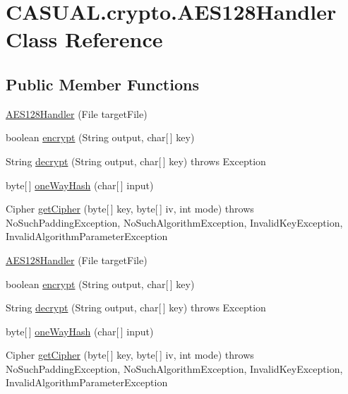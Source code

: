 \hypertarget{class_c_a_s_u_a_l_1_1crypto_1_1_a_e_s128_handler}{\section{C\-A\-S\-U\-A\-L.\-crypto.\-A\-E\-S128\-Handler Class Reference}
\label{class_c_a_s_u_a_l_1_1crypto_1_1_a_e_s128_handler}
}
\subsection*{Public Member Functions}
\begin{DoxyCompactItemize}
\item 
\hyperlink{class_c_a_s_u_a_l_1_1crypto_1_1_a_e_s128_handler_a4233be364193baf998724234ca4c7ab1}{A\-E\-S128\-Handler} (File target\-File)
\item 
boolean \hyperlink{class_c_a_s_u_a_l_1_1crypto_1_1_a_e_s128_handler_ae444a266163b8c7983391cfeca91fd9f}{encrypt} (String output, char\mbox{[}$\,$\mbox{]} key)
\item 
String \hyperlink{class_c_a_s_u_a_l_1_1crypto_1_1_a_e_s128_handler_a27231903f5c8ee3bea634e915c0e1499}{decrypt} (String output, char\mbox{[}$\,$\mbox{]} key)  throws Exception 
\item 
byte\mbox{[}$\,$\mbox{]} \hyperlink{class_c_a_s_u_a_l_1_1crypto_1_1_a_e_s128_handler_af8b956ca34bcdbb8a22551fe66ae2c65}{one\-Way\-Hash} (char\mbox{[}$\,$\mbox{]} input)
\item 
Cipher \hyperlink{class_c_a_s_u_a_l_1_1crypto_1_1_a_e_s128_handler_aa057ae7e639b9622dbed9b17443aa263}{get\-Cipher} (byte\mbox{[}$\,$\mbox{]} key, byte\mbox{[}$\,$\mbox{]} iv, int mode)  throws No\-Such\-Padding\-Exception, No\-Such\-Algorithm\-Exception, Invalid\-Key\-Exception, Invalid\-Algorithm\-Parameter\-Exception 
\item 
\hyperlink{class_c_a_s_u_a_l_1_1crypto_1_1_a_e_s128_handler_a4233be364193baf998724234ca4c7ab1}{A\-E\-S128\-Handler} (File target\-File)
\item 
boolean \hyperlink{class_c_a_s_u_a_l_1_1crypto_1_1_a_e_s128_handler_ae444a266163b8c7983391cfeca91fd9f}{encrypt} (String output, char\mbox{[}$\,$\mbox{]} key)
\item 
String \hyperlink{class_c_a_s_u_a_l_1_1crypto_1_1_a_e_s128_handler_a27231903f5c8ee3bea634e915c0e1499}{decrypt} (String output, char\mbox{[}$\,$\mbox{]} key)  throws Exception 
\item 
byte\mbox{[}$\,$\mbox{]} \hyperlink{class_c_a_s_u_a_l_1_1crypto_1_1_a_e_s128_handler_af8b956ca34bcdbb8a22551fe66ae2c65}{one\-Way\-Hash} (char\mbox{[}$\,$\mbox{]} input)
\item 
Cipher \hyperlink{class_c_a_s_u_a_l_1_1crypto_1_1_a_e_s128_handler_aa057ae7e639b9622dbed9b17443aa263}{get\-Cipher} (byte\mbox{[}$\,$\mbox{]} key, byte\mbox{[}$\,$\mbox{]} iv, int mode)  throws No\-Such\-Padding\-Exception, No\-Such\-Algorithm\-Exception, Invalid\-Key\-Exception, Invalid\-Algorithm\-Parameter\-Exception 
\end{DoxyCompactItemize}
